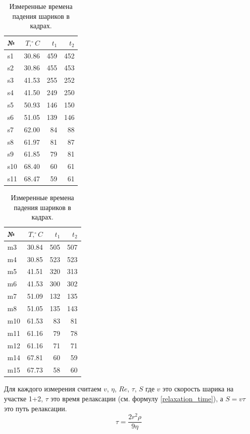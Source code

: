 \documentclass[a4paper, 12pt]{article}
\begin{document}
    \begin{table}[h!]
        \vspace{5pt}
        \begin{center}
        \subtable
        {
            \begin{tabular}{|l|r|r|r|}
            \hline
            {№} & {$T, ^\circ C$} & {$t_1$} & {$t_2$} \\
            \hline
            s1 & 30.86 & 459 & 452 \\
            s2 & 30.86 & 455 & 453 \\
            s3 & 41.53 & 255 & 252 \\
            s4 & 41.50 & 249 & 250 \\
            s5 & 50.93 & 146 & 150 \\
            s6 & 51.05 & 139 & 146 \\
            s7 & 62.00 & 84 & 88 \\
            s8 & 61.97 & 81 & 87 \\
            s9 & 61.85 & 79 & 81 \\
            s10 & 68.40 & 60 & 61 \\
            s11 & 68.47 & 59 & 61 \\
            \hline
            \end{tabular}
        }
        \subtable
        {
            \begin{tabular}{|l|r|r|r|}
            \hline
            {№} & {$T, ^\circ C$} & {$t_1$} & {$t_2$} \\
            \hline
            m3 & 30.84 & 505 & 507 \\
            m4 & 30.85 & 523 & 523 \\
            m5 & 41.51 & 320 & 313 \\
            m6 & 41.53 & 300 & 302 \\
            m7 & 51.09 & 132 & 135 \\
            m8 & 51.05 & 135 & 143 \\
            m10 & 61.53 & 83 & 81 \\
            m11 & 61.16 & 79 & 78 \\
            m12 & 61.16 & 71 & 71 \\
            m14 & 67.81 & 60 & 59 \\
            m15 & 67.73 & 58 & 60 \\
            \hline
            \end{tabular}
        }

        \caption{Измеренные времена падения шариков в кадрах.}
        \label{times_in_frames}
        \end{center}
    \end{table}
    Для каждого измерения считаем $v$, $\eta$, $Re$, $\tau$, $S$ где $v$ это скорость шарика на участке 1+2, $\tau$ это время релаксации (см. формулу \ref{relaxation_time}), а $S=v\tau$ это путь релаксации.
    \begin{equation}\label{relaxation_time}
        \tau = \frac{2r^2\rho}{9\eta}
    \end{equation}
\end{document}
